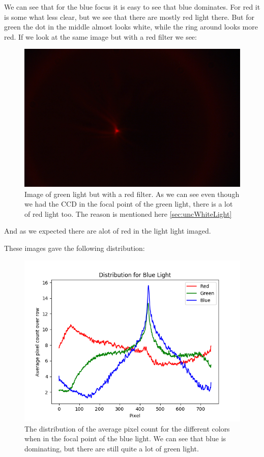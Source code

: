 \documentclass{emulateapj}
\begin{document}
We can see that for the blue focus it is easy to see that blue dominates. For red it is some what less clear, but we see that there are mostly red light there. But for green the dot in the middle almost looks white, while the ring around looks more red. If we look at the same image but with a red filter we see:

\begin{figure}[H]
\centering
\includegraphics[scale=0.2]{red_filter_green_focus.png}
\caption{Image of green light but with a red filter. As we can see even though we had the CCD in the focal point of the green light, there is a lot of red light too. The reason is mentioned here \ref{sec:uncWhiteLight}}
\label{img:red_filter_green_focus}
\end{figure}

And as we expected there are alot of red in the light light imaged.

These images gave the following distribution:

\begin{figure}[H]
\centering
\includegraphics[scale=0.3]{blueDist.png}
\caption{The distribution of the average pixel count for the different colors when in the focal point of the blue light. We can see that blue is dominating, but there are still quite a lot of green light.}
\label{img:green}
\end{figure}
\end{document}
